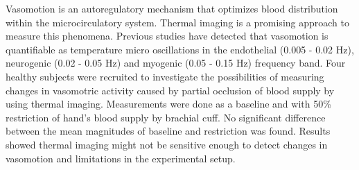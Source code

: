 Vasomotion is an autoregulatory mechanism that optimizes blood distribution within the microcirculatory system. Thermal imaging is a promising approach to measure this phenomena.	
Previous studies have detected that vasomotion is quantifiable as temperature micro oscillations in the endothelial (0.005 - 0.02 Hz), neurogenic (0.02 - 0.05 Hz) and myogenic (0.05 - 0.15 Hz) frequency band. Four healthy subjects were recruited to investigate the possibilities of measuring changes in vasomotric activity caused by partial occlusion of blood supply by using thermal imaging.
Measurements were done as a baseline and with 50\% restriction of hand$’$s blood supply by brachial cuff.
No significant difference between the mean magnitudes of baseline and restriction was found. 
Results showed thermal imaging might not be sensitive enough to detect changes in vasomotion and limitations in the experimental setup.